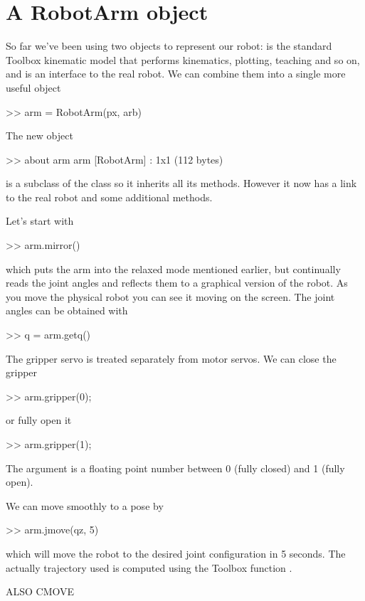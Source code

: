 \documentclass[11pt]{article}
\begin{document}
\section{A RobotArm object}
So far we've been using two objects to represent our robot:  is the standard Toolbox kinematic model that
performs kinematics, plotting, teaching and so on, and  is an interface to the real robot.
We can combine them into a single more useful object
\begin{Code}
>> arm = RobotArm(px, arb)
\end{Code}
The new object
\begin{Code}
>> about arm
arm [RobotArm] : 1x1 (112 bytes)
\end{Code}
is a subclass of the  class so it inherits all its methods.  However it now has a link to the real robot
and some additional methods.

Let's start with
\begin{Code}
>> arm.mirror()
\end{Code}
which puts the arm into the relaxed mode mentioned earlier, but continually reads the joint angles and reflects them to a graphical version of the robot.  As you move the physical robot you can see it moving on the screen.
The joint angles can be obtained with
\begin{Code}
>> q = arm.getq()
\end{Code}

The gripper servo is treated separately from motor servos.  We can close the gripper
\begin{Code}
>> arm.gripper(0);
\end{Code}
or fully open it
\begin{Code}
>> arm.gripper(1);
\end{Code}
The argument is a floating point number between 0 (fully closed) and 1 (fully open).


We can move smoothly to a pose by
\begin{Code}
>> arm.jmove(qz, 5)
\end{Code}
which will move the robot to the desired joint configuration in 5 seconds.  The actually trajectory used is computed using
the Toolbox function .

ALSO CMOVE



\end{document}
